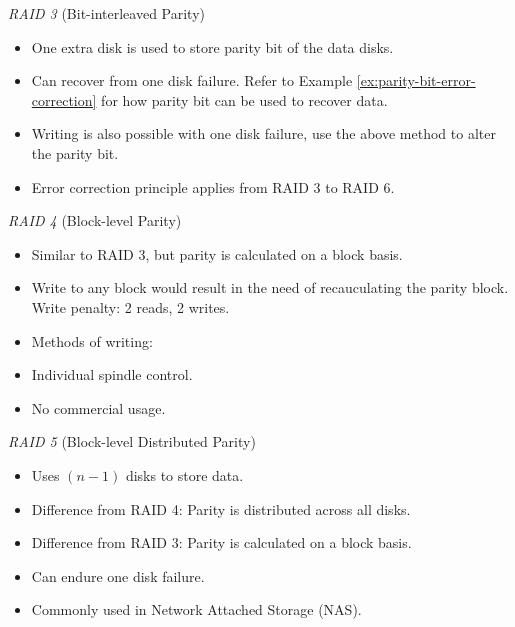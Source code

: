 \emph{RAID 3} {\normalfont\large (Bit-interleaved Parity)}

\begin{itemize}
    \item One extra disk is used to store parity bit of the data disks.
    \item Can recover from one disk failure. Refer to Example \ref{ex:parity-bit-error-correction}
        for how parity bit can be used to recover data.
    \item Writing is also possible with one disk failure, use the above method to alter the
        parity bit.
    \item Error correction principle applies from RAID 3 to RAID 6.
\end{itemize}

\emph{RAID 4} {\normalfont\large (Block-level Parity)}

\begin{itemize}
    \item Similar to RAID 3, but parity is calculated on a block basis.
    \item Write to any block would result in the need of recauculating the parity block.
        Write penalty: 2 reads, 2 writes.
    \item Methods of writing: 
    \item Individual spindle control.
    \item No commercial usage.
\end{itemize}

\emph{RAID 5} {\normalfont\large (Block-level Distributed Parity)}

\begin{itemize}
    \item Uses $(n-1)$ disks to store data.
    \item Difference from RAID 4: Parity is distributed across all disks.
    \item Difference from RAID 3: Parity is calculated on a block basis.
    \item Can endure one disk failure.
    \item Commonly used in Network Attached Storage (NAS).
\end{itemize}

